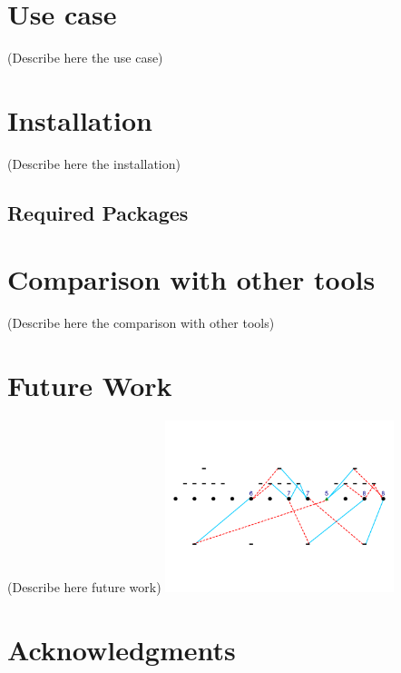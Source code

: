 \documentclass{easychair}
\begin{document}
\section{Use case}
\label{sect:use-case}

(Describe here the use case)


\section{Installation}
\label{sect:installation}

(Describe here the installation)

\subsection{Required Packages}


\section{Comparison with other tools}
\label{sect:comparison}

(Describe here the comparison with other tools)

\section{Future Work}
\label{sect:future-work}

(Describe here future work)
\includegraphics[width=0.5\textwidth]{img01.png}

\section{Acknowledgments}
\label{sect:acknowledgments}
\end{document}
